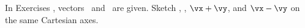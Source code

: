 {\noin In Exercises}
{, vectors \vx\ and \vy\ are given. Sketch \vx, \vy, $\vx+\vy$, and $\vx-\vy$ on the same Cartesian axes.}
